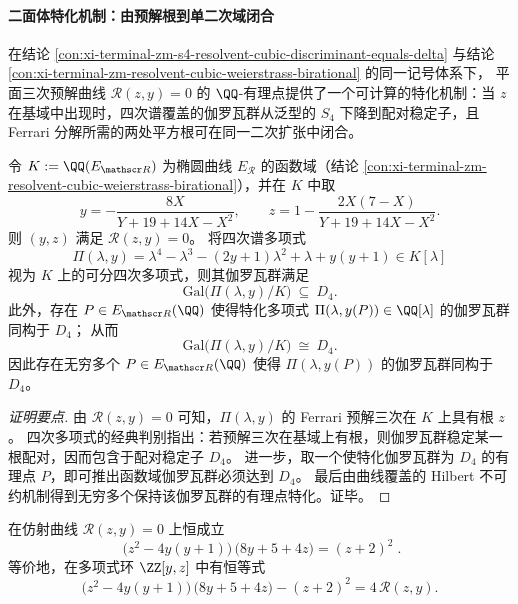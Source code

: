 \paragraph{二面体特化机制：由预解根到单二次域闭合}
在结论 \ref{con:xi-terminal-zm-s4-resolvent-cubic-discriminant-equals-delta} 与结论
\ref{con:xi-terminal-zm-resolvent-cubic-weierstrass-birational} 的同一记号体系下，
平面三次预解曲线 \(\mathscr R(z,y)=0\) 的 \(\QQ\)-有理点提供了一个可计算的特化机制：当 \(z\) 在基域中出现时，四次谱覆盖的伽罗瓦群从泛型的 \(S_4\) 下降到配对稳定子，且 Ferrari 分解所需的两处平方根可在同一二次扩张中闭合。

\begin{theorem}\label{thm:xi-terminal-zm-dihedral-d4-specialization-functionfield}
令 \(K:=\QQ(E_{\mathscr R})\) 为椭圆曲线 \(E_{\mathscr R}\) 的函数域（结论 \ref{con:xi-terminal-zm-resolvent-cubic-weierstrass-birational}），并在 \(K\) 中取
\[
y=-\frac{8X}{Y+19+14X-X^2},
\qquad
z=1-\frac{2X(7-X)}{Y+19+14X-X^2}.
\]
则 \((y,z)\) 满足 \(\mathscr R(z,y)=0\)。
将四次谱多项式
\[
\Pi(\lambda,y)=\lambda^{4}-\lambda^{3}-(2y+1)\lambda^{2}+\lambda+y(y+1)
\in K[\lambda]
\]
视为 \(K\) 上的可分四次多项式，则其伽罗瓦群满足
\[
\mathrm{Gal}\bigl(\Pi(\lambda,y)/K\bigr)\ \subseteq\ D_4.
\]
此外，存在 \(P\in E_{\mathscr R}(\QQ)\) 使得特化多项式 \(\Pi(\lambda,y(P))\in\QQ[\lambda]\) 的伽罗瓦群同构于 \(D_4\)；
从而
\[
\mathrm{Gal}\bigl(\Pi(\lambda,y)/K\bigr)\ \cong\ D_4.
\]
因此存在无穷多个 \(P\in E_{\mathscr R}(\QQ)\) 使得 \(\Pi(\lambda,y(P))\) 的伽罗瓦群同构于 \(D_4\)。
\end{theorem}

\begin{proof}[证明要点]
由 \(\mathscr R(z,y)=0\) 可知，\(\Pi(\lambda,y)\) 的 Ferrari 预解三次在 \(K\) 上具有根 \(z\)。
四次多项式的经典判别指出：若预解三次在基域上有根，则伽罗瓦群稳定某一根配对，因而包含于配对稳定子 \(D_4\)。
进一步，取一个使特化伽罗瓦群为 \(D_4\) 的有理点 \(P\)，即可推出函数域伽罗瓦群必须达到 \(D_4\)。
最后由曲线覆盖的 Hilbert 不可约机制得到无穷多个保持该伽罗瓦群的有理点特化。证毕。
\end{proof}

\begin{proposition}[预解曲线上的二判别式锁定恒等式]\label{prop:xi-terminal-zm-dihedral-double-discriminant-lock}
在仿射曲线 \(\mathscr R(z,y)=0\) 上恒成立
\[
\boxed{\;
\bigl(z^{2}-4y(y+1)\bigr)\,\bigl(8y+5+4z\bigr)=(z+2)^{2}\; }.
\]
等价地，在多项式环 \(\ZZ[y,z]\) 中有恒等式
\[
\bigl(z^{2}-4y(y+1)\bigr)\,\bigl(8y+5+4z\bigr)-(z+2)^{2}=4\,\mathscr R(z,y).
\]
\end{proposition}

